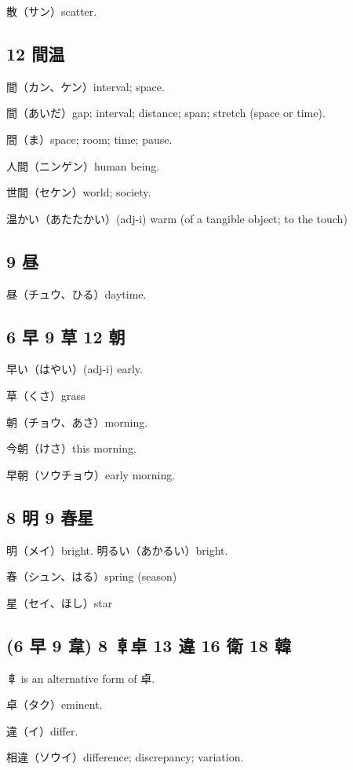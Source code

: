 散（サン）scatter.

\subsection{12 間温}

間（カン、ケン）interval; space.

間（あいだ）gap; interval; distance; span; stretch (space or time).

間（ま）space; room; time; pause.

人間（ニンゲン）human being.

世間（セケン）world; society.

温かい（あたたかい）(adj-i) warm (of a tangible object; to the touch)

\subsection{9 昼}

昼（チュウ、ひる）daytime.

\subsection{6 早 9 草 12 朝}

早い（はやい）(adj-i) early.

草（くさ）grass

朝（チョウ、あさ）morning.

今朝（けさ）this morning.

早朝（ソウチョウ）early morning.

\subsection{8 明 9 春星}

明（メイ）bright.
明るい（あかるい）bright.

春（シュン、はる）spring (season)

星（セイ、ほし）star

\subsection{(6 早 9 韋) 8 𠦝卓 13 違 16 衛 18 韓}

𠦝 is an alternative form of 卓.

卓（タク）eminent.

違（イ）differ.

相違（ソウイ）difference; discrepancy; variation.

